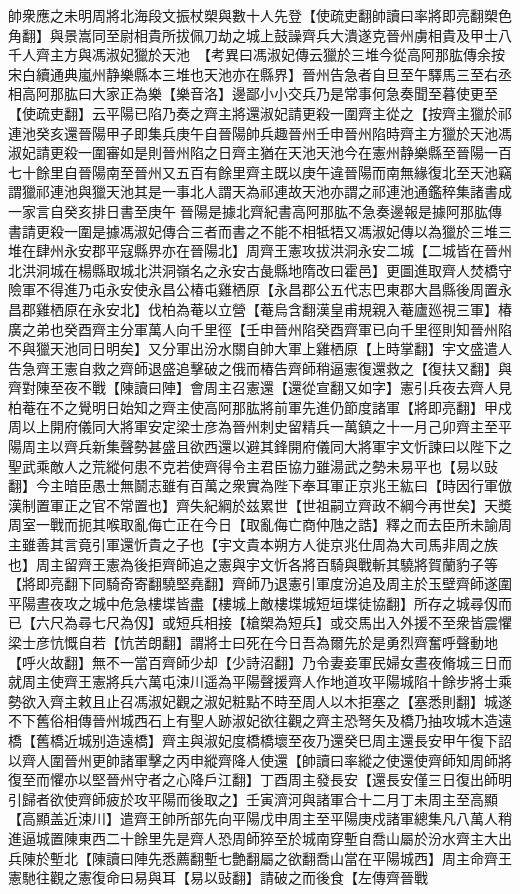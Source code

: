 帥衆應之未明周將北海段文振杖槊與數十人先登【使疏吏翻帥讀曰率將即亮翻槊色角翻】與景嵩同至尉相貴所拔佩刀劫之城上鼓譟齊兵大潰遂克晉州虜相貴及甲士八千人齊主方與馮淑妃獵於天池　【考異曰馮淑妃傳云獵於三堆今從高阿那肱傳余按宋白續通典嵐州静樂縣本三堆也天池亦在縣界】晉州告急者自旦至午驛馬三至右丞相高阿那肱曰大家正為樂【樂音洛】邊鄙小小交兵乃是常事何急奏聞至暮使更至【使疏吏翻】云平陽已陷乃奏之齊主將還淑妃請更殺一圍齊主從之【按齊主獵於祁連池癸亥還晉陽甲子即集兵庚午自晉陽帥兵趣晉州壬申晉州陷時齊主方獵於天池馮淑妃請更殺一圍審如是則晉州陷之日齊主猶在天池天池今在憲州静樂縣至晉陽一百七十餘里自晉陽南至晉州又五百有餘里齊主既以庚午違晉陽而南無緣復北至天池竊謂獵祁連池與獵天池其是一事北人謂天為祁連故天池亦謂之祁連池通鑑稡集諸書成一家言自癸亥排日書至庚午晉陽是據北齊紀書高阿那肱不急奏邊報是據阿那肱傳書請更殺一圍是據馮淑妃傳合三者而書之不能不相牴牾又馮淑妃傳以為獵於三堆三堆在肆州永安郡平寇縣界亦在晉陽北】周齊王憲攻拔洪洞永安二城【二城皆在晉州北洪洞城在楊縣取城北洪洞嶺名之永安古彘縣地隋改曰霍邑】更圖進取齊人焚橋守險軍不得進乃屯永安使永昌公椿屯雞栖原【永昌郡公五代志巴東郡大昌縣後周置永昌郡雞栖原在永安北】伐柏為菴以立營【菴烏含翻漢皇甫規親入菴廬廵視三軍】椿廣之弟也癸酉齊主分軍萬人向千里徑【壬申晉州陷癸酉齊軍已向千里徑則知晉州陷不與獵天池同日明矣】又分軍出汾水關自帥大軍上雞栖原【上時掌翻】宇文盛遣人告急齊王憲自救之齊師退盛追擊破之俄而椿告齊師稍逼憲復還救之【復扶又翻】與齊對陳至夜不戰【陳讀曰陣】會周主召憲還【還從宣翻又如字】憲引兵夜去齊人見柏菴在不之覺明日始知之齊主使高阿那肱將前軍先進仍節度諸軍【將即亮翻】甲戍周以上開府儀同大將軍安定梁士彦為晉州刺史留精兵一萬鎮之十一月己卯齊主至平陽周主以齊兵新集聲勢甚盛且欲西還以避其鋒開府儀同大將軍宇文忻諫曰以陛下之聖武乘敵人之荒縱何患不克若使齊得令主君臣協力雖湯武之勢未易平也【易以䜴翻】今主暗臣愚士無鬬志雖有百萬之衆實為陛下奉耳軍正京兆王紘曰【時因行軍倣漢制置軍正之官不常置也】齊失紀綱於兹累世【世祖嗣立齊政不綱今再世矣】天奬周室一戰而扼其喉取亂侮亡正在今日【取亂侮亡商仲虺之誥】釋之而去臣所未諭周主雖善其言竟引軍還忻貴之子也【宇文貴本朔方人徙京兆仕周為大司馬非周之族也】周主留齊王憲為後拒齊師追之憲與宇文忻各將百騎與戰斬其驍將賀蘭豹子等【將即亮翻下同騎奇寄翻驍堅堯翻】齊師乃退憲引軍度汾追及周主於玉壁齊師遂圍平陽晝夜攻之城中危急樓堞皆盡【樓城上敵樓堞城短垣堞徒協翻】所存之城尋仭而已【六尺為尋七尺為仭】或短兵相接【槍槊為短兵】或交馬出入外援不至衆皆震懼梁士彦忼慨自若【忼苦朗翻】謂將士曰死在今日吾為爾先於是勇烈齊奮呼聲動地【呼火故翻】無不一當百齊師少却【少詩沼翻】乃令妻妾軍民婦女晝夜脩城三日而就周主使齊王憲將兵六萬屯涑川遥為平陽聲援齊人作地道攻平陽城陷十餘步將士乘勢欲入齊主敕且止召馮淑妃觀之淑妃粧點不時至周人以木拒塞之【塞悉則翻】城遂不下舊俗相傳晉州城西石上有聖人跡淑妃欲往觀之齊主恐弩矢及橋乃抽攻城木造遠橋【舊橋近城别造遠橋】齊主與淑妃度橋橋壞至夜乃還癸巳周主還長安甲午復下詔以齊人圍晉州更帥諸軍擊之丙申縱齊降人使還【帥讀曰率縱之使還使齊師知周師將復至而懼亦以堅晉州守者之心降戶江翻】丁酉周主發長安【還長安僅三日復出師明引歸者欲使齊師疲於攻平陽而後取之】壬寅濟河與諸軍合十二月丁未周主至高顯【高顯盖近涑川】遣齊王帥所部先向平陽戊申周主至平陽庚戍諸軍總集凡八萬人稍進逼城置陳東西二十餘里先是齊人恐周師猝至於城南穿塹自喬山屬於汾水齊主大出兵陳於塹北【陳讀曰陣先悉薦翻塹七艶翻屬之欲翻喬山當在平陽城西】周主命齊王憲馳往觀之憲復命曰易與耳【易以䜴翻】請破之而後食【左傳齊晉戰